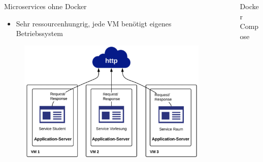 \documentclass[final]{beamer}
\newlength{\sepwid}
\newlength{\onecolwid}
\newlength{\twocolwid}
\begin{document}
\begin{frame}
\begin{columns}[t]
\begin{column}{\onecolwid}
\begin{block}{Microservices ohne Docker}
\begin{itemize}
\item Sehr ressourcenhungrig, jede VM benötigt eigenes Betriebssystem
\end{itemize}

\begin{figure}
\includegraphics[scale=0.60]{as_vm}	
\end{figure}



\end{block}


\end{column} %

\begin{column}{\sepwid}\end{column} %

\begin{column}{\twocolwid} %

\begin{columns}[t,totalwidth=\twocolwid] %

\begin{column}{\onecolwid}\vspace{-.74in} %




\begin{block}{Docker Compose}


\end{block}
\end{column}
\end{columns}
\end{column}
\end{columns}
\end{frame}
\end{document}
